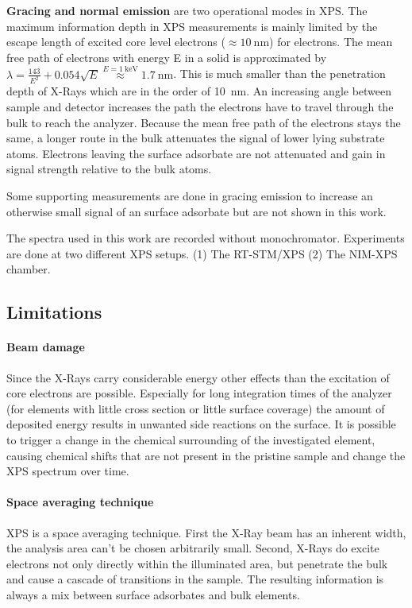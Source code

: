 \textbf{Gracing and normal emission} are two operational modes in XPS. The maximum information depth in XPS measurements is mainly limited by the escape length of excited core level electrons ($\approx \SI{10}{\nano \meter}$) for electrons. The mean free path of electrons with energy E in a solid is approximated by $\lambda = \frac{143}{E^2} + 0.054 \sqrt{E} \stackrel{E=\SI{1}{\kilo \eV}}{\approx} \SI{1.7}{\nano \meter}$.\cite{Seah_Quantitative_1979} This is much smaller than the penetration depth of X-Rays which are in the order of \SI{10}{\nano \meter}. An increasing angle between sample and detector increases the path the electrons have to travel through the bulk to reach the analyzer. Because the mean free path of the electrons stays the same, a longer route in the bulk attenuates the signal of lower lying substrate atoms. Electrons leaving the surface adsorbate are not attenuated and gain in signal strength relative to the bulk atoms.

Some supporting measurements are done in gracing emission to increase an otherwise small signal of an surface adsorbate but are not shown in this work.

The spectra used in this work are recorded without monochromator. Experiments are done at two different XPS setups. (1) The RT-STM/XPS (2) The NIM-XPS chamber.  

\subsection{Limitations}
\paragraph{Beam damage}
Since the X-Rays carry considerable energy other effects than the excitation of core electrons are possible. Especially for long integration times of the analyzer (for elements with little cross section or little surface coverage) the amount of deposited energy results in unwanted side reactions on the surface. It is possible to trigger a change in the chemical surrounding of the investigated element, causing chemical shifts that are not present in the pristine sample and change the XPS spectrum over time.

\paragraph{Space averaging technique}
XPS is a space averaging technique. First the X-Ray beam has an inherent width, the analysis area can't be chosen arbitrarily small. Second, X-Rays do excite electrons not only directly within the illuminated area, but penetrate the bulk and cause a cascade of transitions in the sample. The resulting information is always a mix between surface adsorbates and bulk elements.